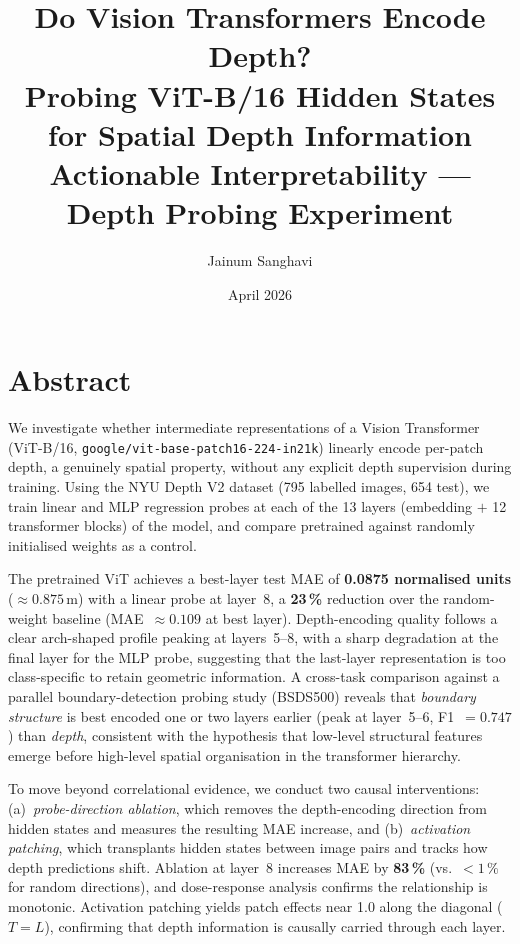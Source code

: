 \documentclass[11pt,a4paper]{article}
\title{%
    \textbf{Do Vision Transformers Encode Depth?} \\[0.5em]
    \large Probing ViT-B/16 Hidden States for Spatial Depth Information \\[0.3em]
    \normalsize Actionable Interpretability --- Depth Probing Experiment
}
\author{Jainum Sanghavi}
\date{April 2026}
\begin{document}
\maketitle
\tableofcontents
\newpage

\section{Abstract}

We investigate whether intermediate representations of a Vision Transformer
(ViT-B/16, \texttt{google/vit-base-patch16-224-in21k}) linearly encode
per-patch depth, a genuinely spatial property, without any explicit depth
supervision during training.  Using the NYU Depth V2 dataset (795 labelled
images, 654 test), we train linear and MLP regression probes at each of the 13
layers (embedding $+$ 12 transformer blocks) of the model, and compare
pretrained against randomly initialised weights as a control.

The pretrained ViT achieves a best-layer test MAE of \textbf{0.0875 normalised
units} ($\approx\!0.875\,\text{m}$) with a linear probe at layer~8, a
\textbf{23\,\%} reduction over the random-weight baseline (MAE~$\approx 0.109$
at best layer).  Depth-encoding quality follows a clear arch-shaped profile
peaking at layers~5--8, with a sharp degradation at the final layer for the MLP
probe, suggesting that the last-layer representation is too class-specific to
retain geometric information.  A cross-task comparison against a parallel
boundary-detection probing study (BSDS500) reveals that \emph{boundary
structure} is best encoded one or two layers earlier (peak at layer~5--6,
F1~$=0.747$) than \emph{depth}, consistent with the hypothesis that low-level
structural features emerge before high-level spatial organisation in the
transformer hierarchy.

To move beyond correlational evidence, we conduct two causal interventions:
(a)~\emph{probe-direction ablation}, which removes the depth-encoding direction
from hidden states and measures the resulting MAE increase, and
(b)~\emph{activation patching}, which transplants hidden states between
image pairs and tracks how depth predictions shift.  Ablation at layer~8
increases MAE by \textbf{83\,\%} (vs.\ $<\!1\,\%$ for random directions),
and dose-response analysis confirms the relationship is monotonic.
Activation patching yields patch effects near 1.0 along the diagonal
($T = L$), confirming that depth information is causally carried through
each layer.
\end{document}
